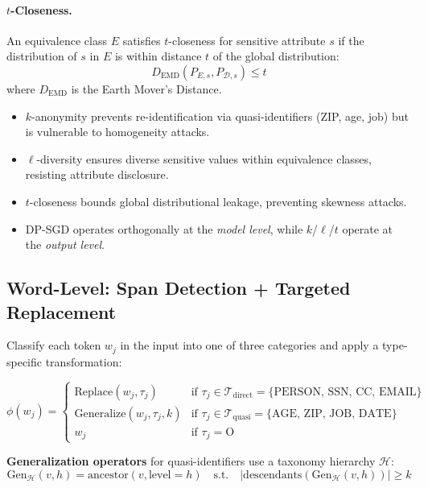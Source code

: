 \documentclass[11pt, a4paper]{article}
\begin{document}
\paragraph{$t$-Closeness.}
An equivalence class $E$ satisfies $t$-closeness for sensitive attribute $s$ if the distribution of $s$ in $E$ is within distance $t$ of the global distribution:
\begin{equation}
D_{\text{EMD}}(P_{E,s}, P_{\mathcal{D},s}) \leq t
\end{equation}
where $D_{\text{EMD}}$ is the Earth Mover's Distance.

\begin{keyresult}
\begin{itemize}[nosep]
  \item $k$-anonymity prevents re-identification via quasi-identifiers (ZIP, age, job) but is vulnerable to homogeneity attacks.
  \item $\ell$-diversity ensures diverse sensitive values within equivalence classes, resisting attribute disclosure.
  \item $t$-closeness bounds global distributional leakage, preventing skewness attacks.
  \item DP-SGD operates orthogonally at the \textit{model level}, while $k$/$\ell$/$t$ operate at the \textit{output level}.
\end{itemize}
\end{keyresult}

\subsection{Word-Level: Span Detection + Targeted Replacement}

Classify each token $w_j$ in the input into one of three categories and apply a type-specific transformation:

\begin{equation}
\phi(w_j) = \begin{cases}
\text{Replace}(w_j, \tau_j) & \text{if } \tau_j \in \mathcal{T}_{\text{direct}} = \{\text{PERSON, SSN, CC, EMAIL}\} \\[3pt]
\text{Generalize}(w_j, \tau_j, k) & \text{if } \tau_j \in \mathcal{T}_{\text{quasi}} = \{\text{AGE, ZIP, JOB, DATE}\} \\[3pt]
w_j & \text{if } \tau_j = \text{O}
\end{cases}
\end{equation}

\textbf{Generalization operators} for quasi-identifiers use a taxonomy hierarchy $\mathcal{H}$:
\begin{equation}
\text{Gen}_{\mathcal{H}}(v, h) = \text{ancestor}(v, \text{level}=h) \quad \text{s.t.} \quad |\text{descendants}(\text{Gen}_{\mathcal{H}}(v, h))| \geq k
\end{equation}
\end{document}

